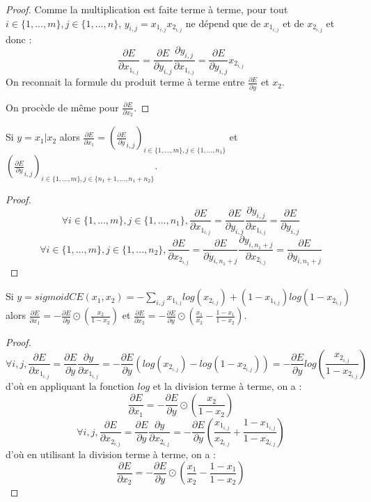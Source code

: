 \begin{proof}
Comme la multiplication est faite terme à terme, pour tout $i \in \{1, ..., m\}, j \in \{1, ..., n\}$, $y_{i, j} = x_{1_{i, j}}x_{2_{i, j}}$ ne dépend que de $x_{1_{i, j}}$ et de $x_{2_{i, j}}$ et donc :
$$
\frac{\partial E}{\partial x_{1_{i, j}}} = \frac{\partial E}{\partial y_{i, j}}\frac{\partial y_{i, j}}{\partial x_{1_{i, j}}} = \frac{\partial E}{\partial y_{i, j}}x_{2_{i, j}}
$$
On reconnait la formule du produit terme à terme entre $\frac{\partial E}{\partial y}$ et $x_2$.

On procède de même pour $\frac{\partial E}{\partial x_2}$.
\end{proof}

\begin{proposition}
Si $y = x_1 | x_2$ alors $\frac{\partial E}{\partial x_1} = (\frac{\partial E}{\partial y}_{i, j})_{i \in \{1, ..., m\}, j \in \{1, ..., n_1\}}$ et $(\frac{\partial E}{\partial y}_{i, j})_{i \in \{1, ..., m\}, j \in \{n_1+1, ..., n_1+n_2\}}$.
\end{proposition}

\begin{proof}
$$
\forall i \in \{1, ..., m\}, j \in \{1, ..., n_1\}, \frac{\partial E}{\partial x_{1_{i, j}}} = \frac{\partial E}{\partial y_{i, j}}\frac{\partial y_{i, j}}{\partial x_{1_{i, j}}} = \frac{\partial E}{\partial y_{i, j}}
$$
$$
\forall i \in \{1, ..., m\}, j \in \{1, ..., n_2\}, \frac{\partial E}{\partial x_{2_{i, j}}} = \frac{\partial E}{\partial y_{i, n_1+j}}\frac{\partial y_{i, n_1+j}}{\partial x_{2_{i, j}}} = \frac{\partial E}{\partial y_{i, n_1+j}}
$$
\end{proof}

\begin{proposition}
Si $y = sigmoidCE(x_1, x_2) = -\sum_{i,j}{x_{1_{i,j}}log(x_{2_{i,j}})+(1-x_{1_{i,j}})log(1-x_{2_{i,j}})}$ alors $\frac{\partial E}{\partial x_1} = -\frac{\partial E}{\partial y} \odot \left(\frac{x_2}{1-x_2}\right)$ et $\frac{\partial E}{\partial x_2} = -\frac{\partial E}{\partial y} \odot \left(\frac{x_1}{x_2} - \frac{1-x_1}{1-x_2}\right)$.
\end{proposition}

\begin{proof}
$$
\forall i, j, \frac{\partial E}{\partial x_{1_{i,j}}} = \frac{\partial E}{\partial y}\frac{\partial y}{\partial x_{1_{i,j}}} = -\frac{\partial E}{\partial y}(log(x_{2_{i,j}}) - log(1-x_{2_{i,j}})) = -\frac{\partial E}{\partial y}log(\frac{x_{2_{i,j}}}{1-x_{2_{i,j}}})
$$
d'où en appliquant la fonction $log$ et la division terme à terme, on a :
$$
\frac{\partial E}{\partial x_1} = -\frac{\partial E}{\partial y} \odot \left(\frac{x_2}{1-x_2}\right)
$$
$$
\forall i, j, \frac{\partial E}{\partial x_{2_{i,j}}} = \frac{\partial E}{\partial y}\frac{\partial y}{\partial x_{2_{i,j}}} = -\frac{\partial E}{\partial y}\left(\frac{x_{1_{i,j}}}{x_{2_{i,j}}}+\frac{1-x_{1_{i,j}}}{1-x_{2_{i,j}}}\right)
$$
d'où en utilisant la division terme à terme, on a :
$$
\frac{\partial E}{\partial x_2} = -\frac{\partial E}{\partial y} \odot \left(\frac{x_1}{x_2} - \frac{1-x_1}{1-x_2}\right)
$$
\end{proof}

